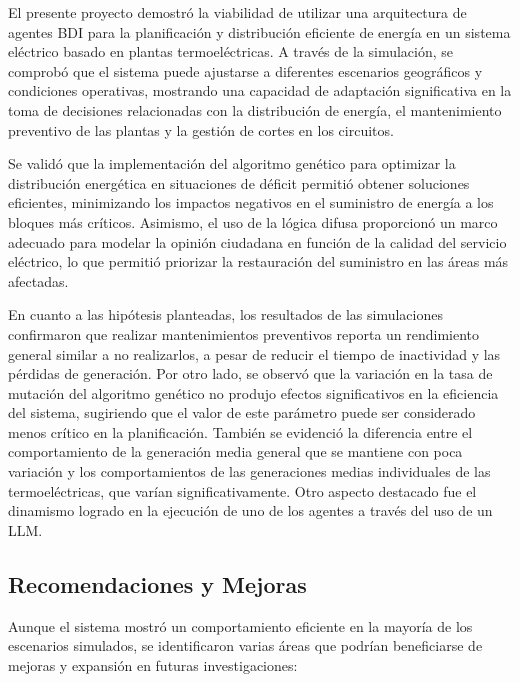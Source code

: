 \documentclass[twocolumn, fontsize=10pt]{article}
\begin{document}
El presente proyecto demostró la viabilidad de utilizar una 
arquitectura de agentes BDI para la planificación y 
distribución eficiente de energía en un sistema eléctrico 
basado en plantas termoeléctricas. A través de la simulación, 
se comprobó que el sistema puede ajustarse a diferentes 
escenarios geográficos y condiciones operativas, mostrando una 
capacidad de adaptación significativa en la toma de decisiones 
relacionadas con la distribución de energía, el mantenimiento 
preventivo de las plantas y la gestión de cortes en los 
circuitos.

Se validó que la implementación del algoritmo genético para 
optimizar la distribución energética en situaciones de déficit 
permitió obtener soluciones eficientes, minimizando los 
impactos negativos en el suministro de energía a los bloques 
más críticos. Asimismo, el uso de la lógica difusa proporcionó 
un marco adecuado para modelar la opinión ciudadana en función 
de la calidad del servicio eléctrico, lo que permitió priorizar 
la restauración del suministro en las áreas más afectadas.

En cuanto a las hipótesis planteadas, los resultados de las 
simulaciones confirmaron que realizar mantenimientos 
preventivos reporta un rendimiento general similar a no realizarlos, a pesar de
reducir el tiempo de inactividad y las pérdidas de 
generación. Por otro lado, se observó que la variación en la 
tasa de mutación del algoritmo genético no produjo efectos 
significativos en la eficiencia del sistema, sugiriendo que el 
valor de este parámetro puede ser considerado menos crítico en 
la planificación. También se evidenció la diferencia entre el comportamiento
de la generación media general que se mantiene con poca variación y los comportamientos de las
generaciones medias individuales de las termoeléctricas, que varían significativamente.
Otro aspecto destacado fue el dinamismo logrado en la ejecución de uno de los 
agentes a través del uso de un LLM.

\subsection{Recomendaciones y Mejoras}

Aunque el sistema mostró un comportamiento eficiente en la mayoría de los escenarios simulados, se identificaron varias áreas que podrían beneficiarse de mejoras y expansión en futuras investigaciones:
\end{document}

